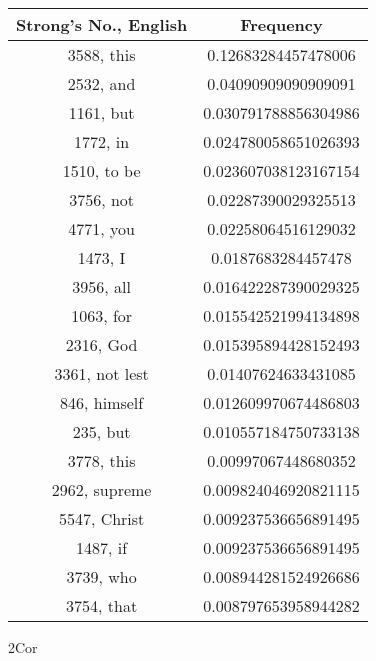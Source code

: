 \documentclass[12pt,letterpaper]{article}
\begin{document}
 \begin{longtable}{|c|c|}
\hline
 Strong's No., English & Frequency \\ \hline  
3588, this & 0.12683284457478006\\ \hline 
 2532, and & 0.04090909090909091\\ \hline 
 1161, but & 0.030791788856304986\\ \hline 
 1772, in & 0.024780058651026393\\ \hline 
 1510, to be & 0.023607038123167154\\ \hline 
 3756, not & 0.02287390029325513\\ \hline 
 4771, you & 0.02258064516129032\\ \hline 
 1473, I & 0.0187683284457478\\ \hline 
 3956, all & 0.016422287390029325\\ \hline 
 1063, for & 0.015542521994134898\\ \hline 
 2316, God & 0.015395894428152493\\ \hline 
 3361, not lest & 0.01407624633431085\\ \hline 
 846, himself & 0.012609970674486803\\ \hline 
 235, but & 0.010557184750733138\\ \hline 
 3778, this & 0.00997067448680352\\ \hline 
 2962, supreme & 0.009824046920821115\\ \hline 
 5547, Christ & 0.009237536656891495\\ \hline 
 1487, if & 0.009237536656891495\\ \hline 
 3739, who & 0.008944281524926686\\ \hline 
 3754, that & 0.008797653958944282\\ \hline 
\end{longtable} 
 

2Cor
\end{document}
